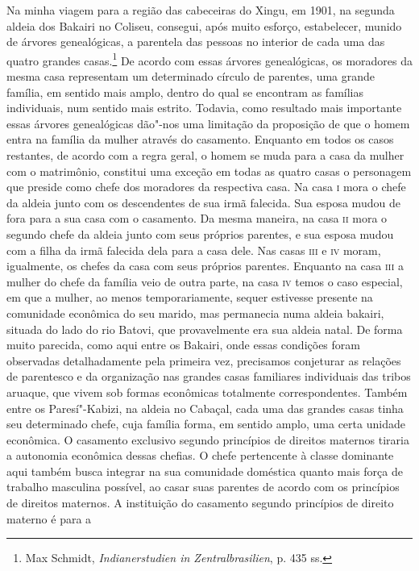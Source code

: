 Na minha viagem para a região das cabeceiras do Xingu, em 1901, na
segunda aldeia dos Bakairi no Coliseu, consegui, após muito esforço,
estabelecer, munido de árvores genealógicas, a parentela das pessoas no
interior de cada uma das quatro grandes casas.\footnote{Max Schmidt,
  \emph{Indianerstudien in Zentralbrasilien}, p. 435 ss.} De acordo com
essas árvores genealógicas, os moradores da mesma casa representam um
determinado círculo de parentes, uma grande família, em sentido mais
amplo, dentro do qual se encontram as famílias individuais, num sentido
mais estrito. Todavia, como resultado mais importante essas árvores
genealógicas dão"-nos uma limitação da proposição de que o homem entra
na família da mulher através do casamento. Enquanto em todos os casos
restantes, de acordo com a regra geral, o homem se muda para a casa da
mulher com o matrimônio, constitui uma exceção em todas as quatro casas
o personagem que preside como chefe dos moradores da respectiva casa. Na
casa \textsc{i} mora o chefe da aldeia junto com os descendentes de sua irmã
falecida. Sua esposa mudou de fora para a sua casa com o casamento. Da
mesma maneira, na casa \textsc{ii} mora o segundo chefe da aldeia junto com seus
próprios parentes, e sua esposa mudou com a filha da irmã falecida dela
para a casa dele. Nas casas \textsc{iii} e \textsc{iv} moram, igualmente, os chefes da
casa com seus próprios parentes. Enquanto na casa \textsc{iii} a mulher do chefe
da família veio de outra parte, na casa \textsc{iv} temos o caso especial, em que
a mulher, ao menos temporariamente, sequer estivesse presente na
comunidade econômica do seu marido, mas permanecia numa aldeia bakairi,
situada do lado do rio Batovi, que provavelmente era sua aldeia natal.
De forma muito parecida, como aqui entre os Bakairi, onde essas
condições foram observadas detalhadamente pela primeira vez, precisamos
conjeturar as relações de parentesco e da organização nas grandes casas
familiares individuais das tribos aruaque, que vivem sob formas
econômicas totalmente correspondentes. Também entre os Paresí"-Kabizi, na
aldeia no Cabaçal, cada uma das grandes casas tinha seu determinado
chefe, cuja família forma, em sentido amplo, uma certa unidade
econômica. O casamento exclusivo segundo princípios de direitos maternos
tiraria a autonomia econômica dessas chefias. O chefe pertencente à
classe dominante aqui também busca integrar na sua comunidade doméstica
quanto mais força de trabalho masculina possível, ao casar suas
parentes de acordo com os princípios de direitos maternos. A
instituição do casamento segundo princípios de direito materno é para a

